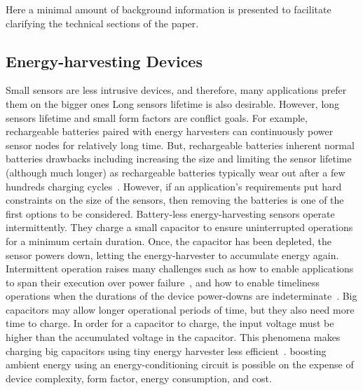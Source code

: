 Here a minimal amount of background information is presented to facilitate clarifying the technical sections of the paper. 

\subsection{Energy-harvesting Devices}

Small sensors are less intrusive devices, and therefore, many applications prefer them on the bigger ones 
%
Long sensors lifetime is also desirable. However, long sensors lifetime and small form factors are conflict goals.
For example, rechargeable batteries paired with energy harvesters can continuously power sensor nodes for relatively long time. But, rechargeable batteries inherent normal batteries drawbacks including increasing the size and limiting the sensor lifetime (although much longer) as rechargeable batteries typically wear out after a few hundreds charging cycles~\cite{}.
%
However, if an application's requirements put hard constraints on the size of the sensors, then removing the batteries is one of the first options to be considered. 
Battery-less energy-harvesting sensors operate intermittently. They charge a small capacitor to ensure uninterrupted operations for a minimum certain duration. Once, the capacitor has been depleted, the sensor powers down, letting the energy-harvester to accumulate energy again. 
%
Intermittent operation raises many challenges such as how to enable applications to span their execution over power failure~\cite{}, and how to enable timeliness operations when the durations of the device power-downs are indeterminate~\cite{}.
%
Big capacitors may allow longer operational periods of time, but they also need more time to charge. 
In order for a capacitor to charge, the input voltage must be higher than the accumulated voltage in the capacitor. 
This phenomena makes charging big capacitors using tiny energy harvester less efficient~\cite{}. 
boosting ambient energy using an energy-conditioning circuit is possible on the expense of device complexity, form factor, energy consumption, and cost. 

